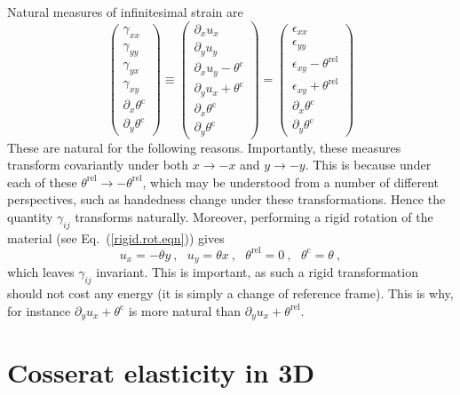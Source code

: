 \documentclass[]{scrreprt}
\newcommand{\pl}{\partial}
\newcommand{\thetac}{\theta^{\mathrm{c}}}
\newcommand{\thetarel}{\theta^{\mathrm{rel}}}
\newcommand{\ep}{\epsilon}
\newcommand{\ga}{\gamma}
\newcommand{\spa}{\ \ \ }
\begin{document}
Natural measures of infinitesimal strain are
\begin{equation}
\left(\begin{array}{c}
\gamma_{xx} \\
\gamma_{yy} \\
\gamma_{yx} \\
\gamma_{xy} \\
\pl_{x}\thetac \\
\pl_{y}\thetac
\end{array}
\right) \equiv
\left(\begin{array}{c}
\pl_{x}u_{x} \\
\pl_{y}u_{y} \\
\pl_{x}u_{y}-\thetac \\
\pl_{y}u_{x}+\thetac \\
\pl_{x}\thetac \\
\pl_{y}\thetac
\end{array}
\right) =
\left(\begin{array}{c}
\ep_{xx} \\
\ep_{yy} \\
\ep_{xy}-\thetarel \\
\ep_{xy}+\thetarel \\
\pl_{x}\thetac \\
\pl_{y}\thetac
\end{array}
\right)
\label{nat.2d.deform.measures}
\end{equation}
These are natural for the following reasons.  Importantly, these
measures transform covariantly under both
$x\rightarrow -x$ and $y\rightarrow -y$.    This is
because under each of these $\thetarel\rightarrow -\thetarel$, which may be
understood from a number of different perspectives, such as handedness
change under these transformations.  Hence the quantity $\ga_{ij}$
transforms naturally.  Moreover, performing a rigid rotation of the
material (see Eq.~(\ref{rigid.rot.eqn})) gives
$$
u_{x}=-\theta y \ , \spa
u_{y}=\theta x \ , \spa
\thetarel = 0 \ , \spa
\thetac = \theta \ ,
$$
which leaves $\ga_{ij}$ invariant.  This is important, as such a rigid
transformation should not cost any energy (it is simply a change of
reference frame).  This is why, for instance $\pl_{y}u_{x}+\thetac$ is
more natural than $\pl_{y}u_{x}+\thetarel$.



\chapter{Cosserat elasticity in 3D}
\label{3d.coss.elas.gen.sec}
\end{document}
